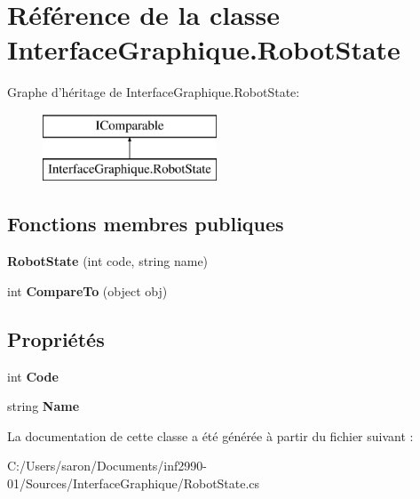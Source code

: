 \hypertarget{class_interface_graphique_1_1_robot_state}{\section{Référence de la classe Interface\-Graphique.\-Robot\-State}
\label{class_interface_graphique_1_1_robot_state}
}
Graphe d'héritage de Interface\-Graphique.\-Robot\-State\-:\begin{figure}[H]
\begin{center}
\leavevmode
\includegraphics[height=2.000000cm]{class_interface_graphique_1_1_robot_state}
\end{center}
\end{figure}
\subsection*{Fonctions membres publiques}
\begin{DoxyCompactItemize}
\item 
\hypertarget{class_interface_graphique_1_1_robot_state_a1aaae3ebeaa2a3fd1dad134c4ad922d4}{{\bfseries Robot\-State} (int code, string name)}\label{class_interface_graphique_1_1_robot_state_a1aaae3ebeaa2a3fd1dad134c4ad922d4}

\item 
\hypertarget{class_interface_graphique_1_1_robot_state_a85667328455130b3a683e8d78dc64e6d}{int {\bfseries Compare\-To} (object obj)}\label{class_interface_graphique_1_1_robot_state_a85667328455130b3a683e8d78dc64e6d}

\end{DoxyCompactItemize}
\subsection*{Propriétés}
\begin{DoxyCompactItemize}
\item 
\hypertarget{class_interface_graphique_1_1_robot_state_af4c8bd65bdf6ec426b5bf775625559d8}{int {\bfseries Code}}\label{class_interface_graphique_1_1_robot_state_af4c8bd65bdf6ec426b5bf775625559d8}

\item 
\hypertarget{class_interface_graphique_1_1_robot_state_a6c8f9165610e2b45bb0374728e885a3d}{string {\bfseries Name}}\label{class_interface_graphique_1_1_robot_state_a6c8f9165610e2b45bb0374728e885a3d}

\end{DoxyCompactItemize}


La documentation de cette classe a été générée à partir du fichier suivant \-:\begin{DoxyCompactItemize}
\item 
C\-:/\-Users/saron/\-Documents/inf2990-\/01/\-Sources/\-Interface\-Graphique/Robot\-State.\-cs\end{DoxyCompactItemize}
